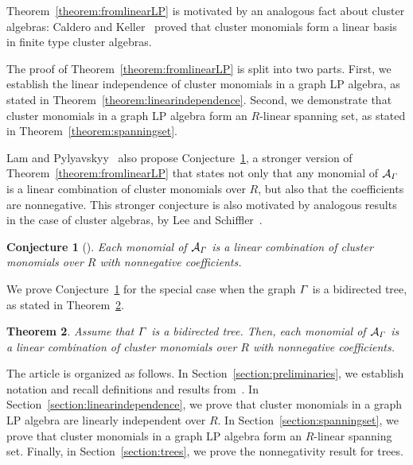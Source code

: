 \documentclass[11pt]{article}
\newtheorem{theo}{Theorem}[section]
\newtheorem{conj}[theo]{Conjecture}
\theoremstyle{definition}
\numberwithin{equation}{section}
\newcommand{\coefficientring}{R}
\newcommand{\graphLPalgebra}[1]{\mathcal{A}_{#1}}
\begin{document}
Theorem~\ref{theorem:fromlinearLP} is motivated by an analogous fact about cluster algebras: Caldero and Keller~\cite{basis} proved that cluster monomials form a linear basis in finite type cluster algebras.

The proof of Theorem~\ref{theorem:fromlinearLP} is split into two parts.
First, we establish the linear independence of cluster monomials in a graph LP algebra, as stated in Theorem~\ref{theorem:linearindependence}.
Second, we demonstrate that cluster monomials in a graph LP algebra form an \(\coefficientring\)-linear spanning set, as stated in Theorem~\ref{theorem:spanningset}. 

Lam and Pylyavskyy~\cite{linearLP} also propose Conjecture~\ref{conjecture:positivity},
a stronger version of Theorem~\ref{theorem:fromlinearLP} that states not only that any monomial of \(\graphLPalgebra{\graph}\) is a linear combination of cluster monomials over \(\coefficientring\),
but also that the coefficients are nonnegative.
This stronger conjecture is also motivated by analogous results in the case of cluster algebras, by Lee and Schiffler~\cite{cluster-positivity-LS}.

\begin{conj}[{\cite[Conjecture 7.3b]{linearLP}}] \label{conjecture:positivity}
    Each monomial of \(\graphLPalgebra{\graph}\) is a linear combination of cluster monomials over \(\coefficientring\) with nonnegative coefficients.
\end{conj}

We prove Conjecture~\ref{conjecture:positivity} for the special case when the graph \(\varGamma\) is a bidirected tree, as stated in Theorem~\ref{theorem:tree}.

\begin{theo} \label{theorem:tree}
    Assume that \(\varGamma\) is a bidirected tree. Then, each monomial of \(\graphLPalgebra{\graph}\) is a linear combination of cluster monomials over \(\coefficientring\) with nonnegative coefficients.
\end{theo}

The article is organized as follows.
In Section~\ref{section:preliminaries}, we establish notation and recall definitions and results from~\cite{linearLP}.
In Section~\ref{section:linearindependence}, we prove that cluster monomials in a graph LP algebra are linearly independent over \(\coefficientring\).
In Section~\ref{section:spanningset}, we prove that cluster monomials in a graph LP algebra form an \(\coefficientring\)-linear spanning set. Finally, in Section~\ref{section:trees}, we prove the nonnegativity result for trees. 
\end{document}
